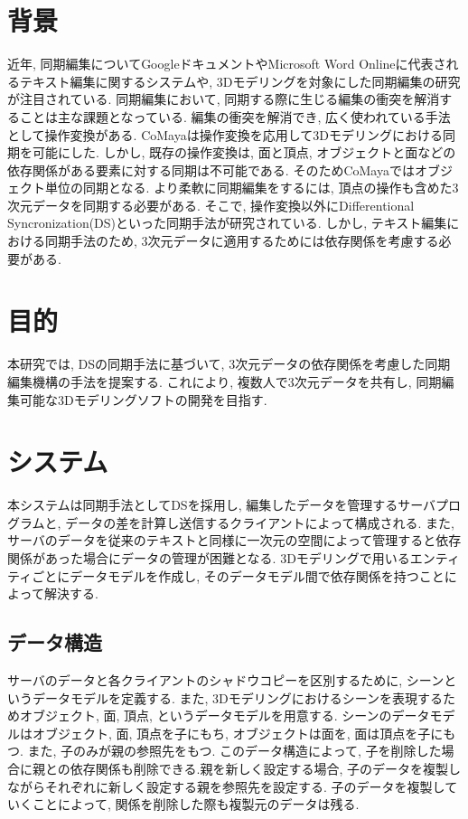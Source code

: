 \documentclass{AIabst}
\begin{document}
\makeAbstHeader
%
%
%
\section{背景}
	近年, 同期編集についてGoogleドキュメントやMicrosoft Word Onlineに代表されるテキスト編集に関するシステムや, 3Dモデリングを対象にした同期編集の研究が注目されている.
	同期編集において, 同期する際に生じる編集の衝突を解消することは主な課題となっている.
	編集の衝突を解消でき, 広く使われている手法として操作変換がある.
	CoMaya\cite{COMAYA}は操作変換を応用して3Dモデリングにおける同期を可能にした.
	しかし, 既存の操作変換は, 面と頂点, オブジェクトと面などの依存関係がある要素に対する同期は不可能である.
	そのためCoMayaではオブジェクト単位の同期となる.
	より柔軟に同期編集をするには, 頂点の操作も含めた3次元データを同期する必要がある.
	そこで, 操作変換以外にDifferentional Syncronization(DS)\cite{DS}といった同期手法が研究されている.
	しかし, テキスト編集における同期手法のため, 3次元データに適用するためには依存関係を考慮する必要がある.
\section{目的}
 本研究では, DSの同期手法に基づいて, 3次元データの依存関係を考慮した同期編集機構の手法を提案する.
  これにより, 複数人で3次元データを共有し, 同期編集可能な3Dモデリングソフトの開発を目指す.
\section{システム}
 本システムは同期手法としてDSを採用し, 編集したデータを管理するサーバプログラムと, データの差を計算し送信するクライアントによって構成される.
  また, サーバのデータを従来のテキストと同様に一次元の空間によって管理すると依存関係があった場合にデータの管理が困難となる.
  3Dモデリングで用いるエンティティごとにデータモデルを作成し, そのデータモデル間で依存関係を持つことによって解決する.
  \subsection{データ構造}
  サーバのデータと各クライアントのシャドウコピーを区別するために, シーンというデータモデルを定義する.
  また, 3Dモデリングにおけるシーンを表現するためオブジェクト, 面, 頂点, というデータモデルを用意する.
  シーンのデータモデルはオブジェクト, 面, 頂点を子にもち, オブジェクトは面を, 面は頂点を子にもつ. また, 子のみが親の参照先をもつ.
   このデータ構造によって, 子を削除した場合に親との依存関係も削除できる.親を新しく設定する場合, 子のデータを複製しながらそれぞれに新しく設定する親を参照先を設定する.
   子のデータを複製していくことによって, 関係を削除した際も複製元のデータは残る.
\end{document}
